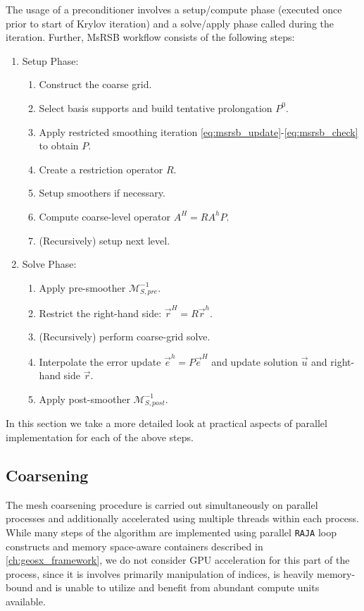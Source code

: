 The usage of a preconditioner involves a setup/compute phase (executed once prior to start of Krylov iteration) and a solve/apply phase called during the iteration.   Further, MsRSB workflow consists of the following steps:
\begin{enumerate}
\item Setup Phase:
    \begin{enumerate}
        \item Construct the coarse grid.
        \item Select basis supports and build tentative prolongation $P^0$.
        \item Apply restricted smoothing iteration \eqref{eq:msrsb_update}-\eqref{eq:msrsb_check} to obtain $P$.
        \item Create a restriction operator $R$.
        \item Setup smoothers if necessary.
        \item Compute coarse-level operator $A^H = RA^hP$.
        \item (Recursively) setup next level.
    \end{enumerate}
\item Solve Phase:
    \begin{enumerate}
        \item Apply pre-smoother $\mathcal{M}_{S,pre}^{-1}$.
        \item Restrict the right-hand side: $\vec{r}^H = R\vec{r}^h$.
        \item (Recursively) perform coarse-grid solve.
        \item Interpolate the error update $\vec{e}^h = P\vec{e}^H$ and update solution $\vec{u}$ and right-hand side $\vec{r}$.
        \item Apply post-smoother $\mathcal{M}_{S,post}^{-1}$.
    \end{enumerate}
\end{enumerate}
In this section we take a more detailed look at practical aspects of parallel implementation for each of the above steps.

\subsection{Coarsening}
\label{subsec:par_kernels_coarsening}

The mesh coarsening procedure is carried out simultaneously on parallel processes and additionally accelerated using multiple threads within each process.   While many steps of the algorithm are implemented using parallel \texttt{RAJA} loop constructs and memory space-aware containers described in \autoref{ch:geosx_framework}, we do not consider GPU acceleration for this part of the process, since it is involves primarily manipulation of indices, is heavily memory-bound and is unable to utilize and benefit from abundant compute units available.
 
